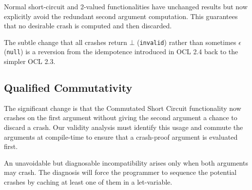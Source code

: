 \documentclass[
]{ceurart}
\begin{document}
Normal short-circuit and 2-valued functionalities have unchanged results but now explicitly avoid the redundant second argument computation. This guarantees that no desirable crash is computed and then discarded.


The subtle change that all crashes return $\bot$ (\verb|invalid|) rather than sometimes $\epsilon$ (\verb|null|) is a reversion from the idempotence introduced in OCL 2.4 back to the simpler OCL 2.3.

\subsection{Qualified Commutativity}

The significant change is that the Commutated Short Circuit functionality now crashes on the first argument without giving the second argument a chance to discard a crash. Our validity analysis must identify this usage and commute the arguments at compile-time to ensure that a crash-proof argument is evaluated first.

An unavoidable but diagnosable incompatibility arises only when both arguments may crash. The diagnosis will force the programmer to sequence the potential crashes by caching at least one of them in a let-variable.

 
 
\end{document}
